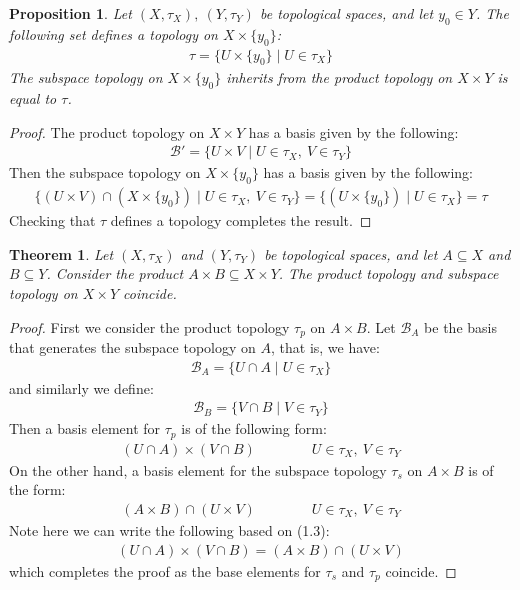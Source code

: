 \documentclass[11pt]{book}
\theoremstyle{break}
\theoremstyle{break}
\newtheorem{thm}{Theorem}[section]
\newtheorem{prop}[lem]{Proposition}
\begin{document}
\newpage
\begin{prop}
Let $(X,\tau_X),\ (Y,\tau_Y)$ be topological spaces, and let $y_0 \in Y$. The following set defines a topology on $X \times \{y_0\}$:
\begin{align*}
\tau = \{ U \times \{y_0\}\mid U \in \tau_X\}
\end{align*}
The subspace topology on $X \times \{ y_0\}$ inherits from the product topology on $X\times Y$ is equal to $\tau$. 
\end{prop}
\begin{proof}
The product topology on $X \times Y$ has a basis given by the following:
\begin{align*}
\mathcal{B} ' = \{ U \times V \mid U \in \tau_X, \ V \in \tau_Y\}
\end{align*}
Then the subspace topology on $X\times \{y_0\}$ has a basis given by the following:
\begin{align*}
\{ (U \times V) \cap (X \times \{y_0\}) \mid U \in \tau_X,\ V\in \tau_Y\} = \{ (U \times \{y_0\} )\mid U \in \tau_X\} = \tau
\end{align*} 
Checking that $\tau$ defines a topology completes the result.
\end{proof}


\begin{thm}
Let $(X,\tau_X)$ and $(Y,\tau_Y)$ be topological spaces, and let $A\subseteq X$ and $B \subseteq Y$. Consider the product $A \times B \subseteq X \times Y$. The product topology and subspace topology on $X \times Y$ coincide. 
\end{thm}
\begin{proof}
First we consider the product topology $\tau_p$ on $A\times B$. Let $\mathcal{B}_A$ be the basis that generates the subspace topology on $A$, that is, we have:
\begin{align*}
\mathcal{B}_A = \{ U \cap A \mid U \in \tau_X\}
\end{align*}
and similarly we define:
\begin{align*}
\mathcal{B}_B = \{ V\cap B \mid V\in \tau_Y\}
\end{align*}
Then a basis element for $\tau_p$ is of the following form:
\begin{align}
(U\cap A) \times (V\cap B) \qquad \qquad U \in \tau_X,\ V\in \tau_Y
\end{align}
On the other hand, a basis element for the subspace topology $\tau_s$ on $A\times B$ is of the form:
\begin{align*}
(A\times B) \cap (U \times V) \qquad \qquad U\in \tau_X,\ V\in \tau_Y
\end{align*}
Note here we can write the following based on (1.3):
\begin{align*}
(U \cap A) \times (V\cap B) = (A\times B) \cap (U \times V)
\end{align*}
which completes the proof as the base elements for $\tau_s$ and $\tau_p$ coincide.
\end{proof}
\end{document}
